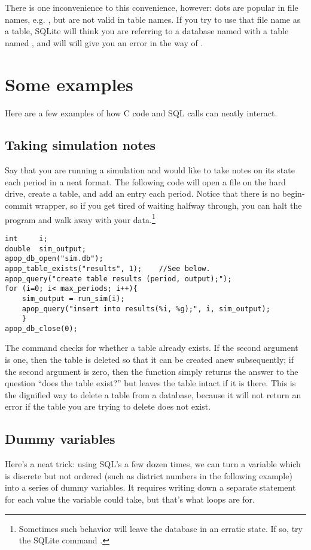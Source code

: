 There is one inconvenience to this convenience, however: dots are popular
in file names, e.g. , but are not valid in table names. If
you try to use that file name as a table, SQLite will think you are
referring to a database named  with a table named ,
and will will give you an error in the way of .

\section{Some examples} 
Here are a few examples of how C code and SQL calls can neatly interact.

\subsection{Taking simulation notes}\label{createeg}
Say that you are running a simulation and would like to take notes on
its state each period in a neat format. The following code will open a
file on the hard drive, create a table, and add an entry each period.
Notice that there is no begin-commit wrapper, so if you get tired of
waiting halfway through, you can halt the program and walk away with
your data.\footnote{Sometimes such behavior will leave the database in
an erratic state. If so, try the SQLite command .}

\begin{lstlisting}
int     i;
double  sim_output;
apop_db_open("sim.db");
apop_table_exists("results", 1);    //See below.
apop_query("create table results (period, output);");
for (i=0; i< max_periods; i++){
    sim_output = run_sim(i);
    apop_query("insert into results(%i, %g);", i, sim_output);
    }
apop_db_close(0);
\end{lstlisting}

The  command checks for whether a table
already exists. If the second argument is one, then the table is deleted
so that it can be created anew subsequently; if the second argument is
zero, then the function simply returns the answer to the question ``does
the table exist?'' but leaves the table intact if it is there. This is
the dignified way to delete a table from a database, because it will not
return an error if the table you are trying to delete does not exist.

\subsection{Dummy variables}
Here's a neat trick: using SQL's  a few dozen times, we can turn a
variable which is discrete but not ordered (such as district numbers in the
following example) into a series of dummy variables. It requires writing down a
separate  statement for each value the variable could take, but that's
what  loops are for.

